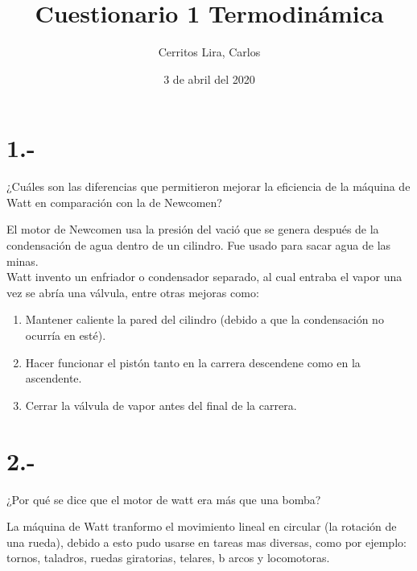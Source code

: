 \documentclass{article}
\title{Cuestionario 1 Termodinámica}
\author{Cerritos Lira, Carlos}
\date{3 de abril del 2020}
\begin{document}
\maketitle
\section*{1.-}
¿Cuáles son las diferencias que permitieron mejorar la eficiencia de la máquina de Watt en 
comparación con la de Newcomen?
\begin{tcolorbox}[breakable]
    El motor de Newcomen usa la presión del vació que se genera después de la condensación 
    de agua dentro de un cilindro. Fue usado para sacar agua de las minas. \\
    Watt invento un enfriador o condensador separado, al cual entraba el vapor una vez se abría 
    una válvula, entre otras mejoras como:
    \begin{enumerate}
        \item Mantener caliente la pared del cilindro (debido a que la condensación no ocurría en esté).
        \item Hacer funcionar el pistón tanto en la carrera descendene como en la ascendente.
        \item Cerrar la válvula de vapor antes del final de la carrera.
    \end{enumerate}
    \end{tcolorbox}

\section*{2.-}
¿Por qué se dice que el motor de watt era más que una bomba?
\begin{tcolorbox}[breakable]
    La máquina de Watt tranformo el movimiento lineal en circular (la rotación de una rueda),
    debido a esto pudo usarse en tareas mas diversas, como por ejemplo: tornos, taladros, 
    ruedas giratorias, telares, b arcos y locomotoras.
\end{tcolorbox}
\end{document}
